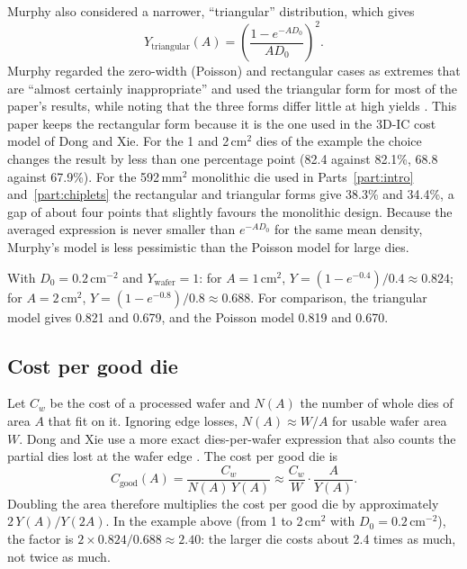 Murphy also considered a narrower, ``triangular'' distribution, which gives
\begin{equation*}
  Y_{\mathrm{triangular}}(A) = \left(\frac{1 - e^{-AD_0}}{AD_0}\right)^{2}.
\end{equation*}
Murphy regarded the zero-width (Poisson) and rectangular cases as extremes that are ``almost certainly inappropriate'' and used the triangular form for most of the paper's results, while noting that the three forms differ little at high yields \cite[p.~1539]{murphyCostsizeOptimaMonolithic1964}. This paper keeps the rectangular form because it is the one used in the 3D-IC cost model of Dong and Xie. For the 1 and 2\,cm$^2$ dies of the example the choice changes the result by less than one percentage point (82.4 against 82.1\%, 68.8 against 67.9\%). For the 592\,mm$^2$ monolithic die used in Parts~\ref{part:intro} and~\ref{part:chiplets} the rectangular and triangular forms give 38.3\% and 34.4\%, a gap of about four points that slightly favours the monolithic design. Because the averaged expression is never smaller than $e^{-AD_0}$ for the same mean density, Murphy's model is less pessimistic than the Poisson model for large dies.

With $D_0 = 0.2$\,cm$^{-2}$ and $Y_{\mathrm{wafer}} = 1$: for $A = 1$\,cm$^2$, $Y = (1-e^{-0.4})/0.4 \approx 0.824$; for $A = 2$\,cm$^2$, $Y = (1-e^{-0.8})/0.8 \approx 0.688$. For comparison, the triangular model gives 0.821 and 0.679, and the Poisson model 0.819 and 0.670.

\subsection{Cost per good die}
Let $C_w$ be the cost of a processed wafer and $N(A)$ the number of whole dies of area $A$ that fit on it. Ignoring edge losses, $N(A) \approx W/A$ for usable wafer area $W$. Dong and Xie use a more exact dies-per-wafer expression that also counts the partial dies lost at the wafer edge \cite{dongSystemlevelCostAnalysis2009}. The cost per good die is
\begin{equation*}
  C_{\text{good}}(A) = \frac{C_w}{N(A)\, Y(A)} \approx \frac{C_w}{W}\cdot\frac{A}{Y(A)}.
\end{equation*}
Doubling the area therefore multiplies the cost per good die by approximately $2\,Y(A)/Y(2A)$. In the example above (from 1 to 2\,cm$^2$ with $D_0=0.2$\,cm$^{-2}$), the factor is $2 \times 0.824/0.688 \approx 2.40$: the larger die costs about 2.4 times as much, not twice as much.

